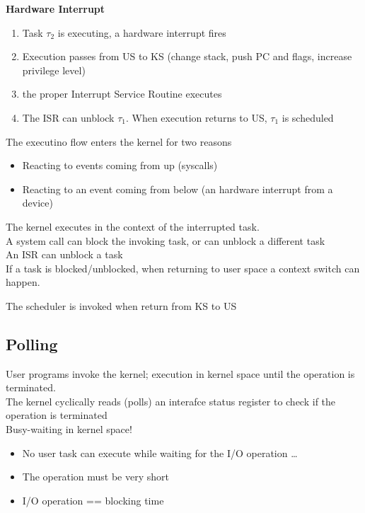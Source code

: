 \textbf{Hardware Interrupt}
\begin{enumerate}
    \item Task $\tau_2$ is executing, a hardware interrupt fires
    \item Execution passes from US to KS (change stack, push PC and flags, increase privilege level)
    \item the proper Interrupt Service Routine executes
    \item The ISR can unblock $\tau_1$. When execution returns to US, $\tau_1$ is scheduled
\end{enumerate}

The executino flow enters the kernel for two reasons
\begin{itemize}
    \item Reacting to events coming from up (syscalls)
    \item Reacting to an event coming from below (an hardware interrupt from a device)
\end{itemize}
The kernel executes in the context of the interrupted task.\\
A system call can block the invoking task, or can unblock a different task\\
An ISR can unblock a task\\
If a task is blocked/unblocked, when returning to user space a context switch can happen.

The scheduler is invoked when return from KS to US


\subsection{Polling}
    User programs invoke the kernel; execution in kernel space until the operation is terminated.\\
    The kernel cyclically reads (polls) an interafce status register to check if the operation is terminated\\
    Busy-waiting in kernel space!
    \begin{itemize}
        \item No user task can execute while waiting for the I/O operation \dots
        \item The operation must be very short
        \item I/O operation == blocking time
    \end{itemize} 

